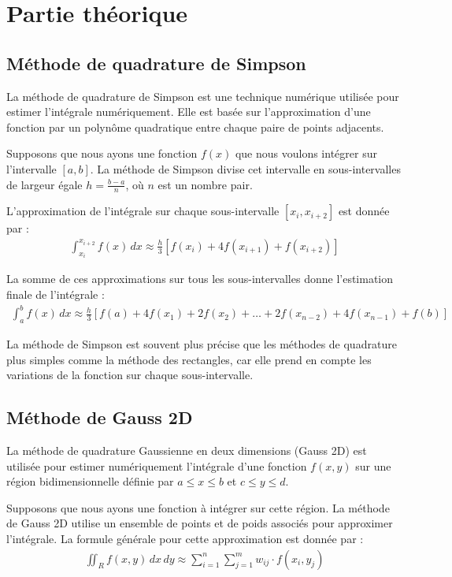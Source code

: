 \documentclass[10pt,a4paper]{article}
\begin{document}
\section{Partie théorique}

\subsection{Méthode de quadrature de Simpson}

La méthode de quadrature de Simpson est une technique numérique utilisée pour estimer l'intégrale numériquement. Elle est basée sur l'approximation d'une fonction par un polynôme quadratique entre chaque paire de points adjacents.

Supposons que nous ayons une fonction $f(x)$ que nous voulons intégrer sur l'intervalle $[a, b]$. La méthode de Simpson divise cet intervalle en sous-intervalles de largeur égale $h = \frac{b - a}{n}$, où $n$ est un nombre pair.

L'approximation de l'intégrale sur chaque sous-intervalle $[x_i, x_{i+2}]$ est donnée par :
\begin{align*}
\int_{x_i}^{x_{i+2}} f(x) \,dx \approx \frac{h}{3} \left[ f(x_i) + 4f(x_{i+1}) + f(x_{i+2}) \right]
\end{align*}

La somme de ces approximations sur tous les sous-intervalles donne l'estimation finale de l'intégrale :
\begin{align*}
\int_{a}^{b} f(x) \,dx \approx \frac{h}{3} \left[ f(a) + 4f(x_1) + 2f(x_2) + \ldots + 2f(x_{n-2}) + 4f(x_{n-1}) + f(b) \right]
\end{align*}

La méthode de Simpson est souvent plus précise que les méthodes de quadrature plus simples comme la méthode des rectangles, car elle prend en compte les variations de la fonction sur chaque sous-intervalle.


\subsection{Méthode de Gauss 2D}


La méthode de quadrature Gaussienne en deux dimensions (Gauss 2D) est utilisée pour estimer numériquement l'intégrale d'une fonction $f(x, y)$ sur une région bidimensionnelle définie par $a \leq x \leq b$ et $c \leq y \leq d$.

Supposons que nous ayons une fonction à intégrer sur cette région. La méthode de Gauss 2D utilise un ensemble de points et de poids associés pour approximer l'intégrale. La formule générale pour cette approximation est donnée par :
\begin{align*}
\iint_{R} f(x, y) \,dx\,dy \approx \sum_{i=1}^{n} \sum_{j=1}^{m} w_{ij} \cdot f(x_i, y_j)
\end{align*}
\end{document}
